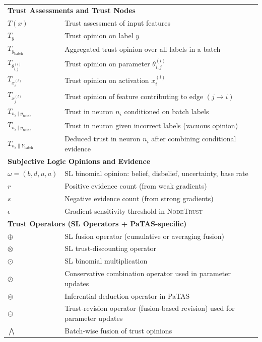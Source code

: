 \begin{table}[H]
\begin{tabular}{ll}
\multicolumn{2}{l}{\textbf{Trust Assessments and Trust Nodes}} \\
$T(x)$ & Trust assessment of input features \\
$T_y$ & Trust opinion on label $y$ \\
$T_{y_{\text{batch}}}$ & Aggregated trust opinion over all labels in a batch \\
$T_{\theta^{(l)}_{i,j}}$ & Trust opinion on parameter $\theta^{(l)}_{i,j}$ \\
$T_{x^{(l)}_i}$ & Trust opinion on activation $x^{(l)}_i$ \\
$T_{x^{(l)}_j}$ & Trust opinion of feature contributing to edge $(j \to i)$ \\
$T_{n_i \mid y_{\text{batch}}}$ & Trust in neuron $n_i$ conditioned on batch labels \\
$T_{n_i \mid \overline{y_{\text{batch}}}}$ & Trust in neuron given incorrect labels (vacuous opinion) \\
$T_{n_i \parallel Y_{\text{batch}}}$ & Deduced trust in neuron $n_i$ after combining conditional evidence \\[4pt]

\multicolumn{2}{l}{\textbf{Subjective Logic Opinions and Evidence}} \\
$\omega = (b,d,u,a)$ & SL binomial opinion: belief, disbelief, uncertainty, base rate \\
$r$ & Positive evidence count (from weak gradients) \\
$s$ & Negative evidence count (from strong gradients) \\
$\epsilon$ & Gradient sensitivity threshold in \textsc{NodeTrust} \\[4pt]

\multicolumn{2}{l}{\textbf{Trust Operators (SL Operators + PaTAS-specific)}} \\
$\oplus$ & SL fusion operator (cumulative or averaging fusion) \\
$\otimes$ & SL trust-discounting operator \\
$\odot$ & SL binomial multiplication \\
$\oslash$ & Conservative combination operator used in parameter updates \\
$\circledcirc$ & Inferential deduction operator in PaTAS \\
$\circleddash$ & Trust-revision operator (fusion-based revision) used for parameter updates \\
$\bigwedge$ & Batch-wise fusion of trust opinions \\[4pt]


\end{tabular}
\end{table}
